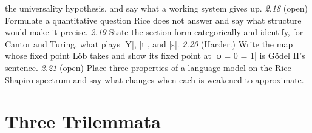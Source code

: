 \documentclass{memoir}
\begin{document}
the universality hypothesis, and say what a working system gives up.
\emph{2.18} (open) Formulate a quantitative question Rice does not answer and say what
structure would make it precise.
\emph{2.19} State the section form categorically and identify, for Cantor and Turing, what
plays \LeanVerb|Y|, \LeanVerb|t|, and \LeanVerb|s|.
\emph{2.20} (Harder.) Write the map whose fixed point Löb takes and show its fixed point at
\LeanVerb|φ = 0 = 1| is Gödel II's sentence.
\emph{2.21} (open) Place three properties of a language model on the Rice–Shapiro spectrum
and say what changes when each is weakened to approximate.



\section{Three Trilemmata}\label{Two--Schemas--of--Impossibility-005F-005F-005F--Machine--Checked--Limits--of--Trustworthy--Machine--Learning-005F-005F-005F--and--Why--They--Tighten--with--Capability----Exercises----Three--Trilemmata}
\end{document}

